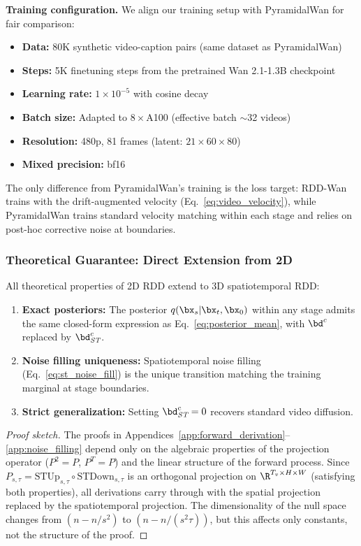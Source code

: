 \textbf{Training configuration.} We align our training setup with PyramidalWan for fair comparison:
\begin{itemize}
    \item \textbf{Data:} 80K synthetic video-caption pairs (same dataset as PyramidalWan)
    \item \textbf{Steps:} 5K finetuning steps from the pretrained Wan 2.1-1.3B checkpoint
    \item \textbf{Learning rate:} $1 \times 10^{-5}$ with cosine decay
    \item \textbf{Batch size:} Adapted to $8\times$A100 (effective batch $\sim$32 videos)
    \item \textbf{Resolution:} 480p, 81 frames (latent: $21 \times 60 \times 80$)
    \item \textbf{Mixed precision:} bf16
\end{itemize}

The only difference from PyramidalWan's training is the loss target: RDD-Wan trains with the drift-augmented velocity (Eq.~\ref{eq:video_velocity}), while PyramidalWan trains standard velocity matching within each stage and relies on post-hoc corrective noise at boundaries.

\subsubsection{Theoretical Guarantee: Direct Extension from 2D}

\begin{proposition}
\label{prop:st_extension}
All theoretical properties of 2D RDD extend to 3D spatiotemporal RDD:
\begin{enumerate}
    \item \textbf{Exact posteriors:} The posterior $q(\bx_s | \bx_t, \bx_0)$ within any stage admits the same closed-form expression as Eq.~\eqref{eq:posterior_mean}, with $\bd^c$ replaced by $\bd^c_{\emph{ST}}$.
    \item \textbf{Noise filling uniqueness:} Spatiotemporal noise filling (Eq.~\ref{eq:st_noise_fill}) is the unique transition matching the training marginal at stage boundaries.
    \item \textbf{Strict generalization:} Setting $\bd^c_{\emph{ST}} = 0$ recovers standard video diffusion.
\end{enumerate}
\end{proposition}

\begin{proof}[Proof sketch]
The proofs in Appendices~\ref{app:forward_derivation}--\ref{app:noise_filling} depend only on the algebraic properties of the projection operator ($P^2 = P$, $P^T = P$) and the linear structure of the forward process.
Since $P_{s,\tau} = \text{STUp}_{s,\tau} \circ \text{STDown}_{s,\tau}$ is an orthogonal projection on $\R^{T_v \times H \times W}$ (satisfying both properties), all derivations carry through with the spatial projection replaced by the spatiotemporal projection.
The dimensionality of the null space changes from $(n - n/s^2)$ to $(n - n/(s^2 \tau))$, but this affects only constants, not the structure of the proof.
\end{proof}


